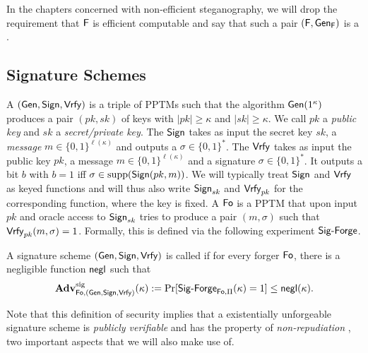 In the chapters concerned with
non-efficient steganography, we will drop the requirement that $\operatorname{\mathsf{F}}$ is
efficient computable and say that such a pair $(\operatorname{\mathsf{F}},\operatorname{\mathsf{Gen}}_{\operatorname{\mathsf{F}}})$ is a
. 


\subsection*{Signature Schemes}
A  $(\operatorname{\mathsf{Gen}},\operatorname{\mathsf{Sign}},\operatorname{\mathsf{Vrfy}})$ is a triple of
\acp{PPTM} such that the algorithm $\operatorname{\mathsf{Gen}}(1^{\kappa})$ produces a pair $(pk,sk)$ of
keys with $|pk|\geq \kappa$ and $|sk|\geq \kappa$. We call $pk$ a
\emph{public key} and $sk$ a \emph{secret/private key}. The  $\operatorname{\mathsf{Sign}}$ takes as input the secret key $sk$, a \emph{message}
$m\in \{0,1\}^{\ell(\kappa)}$ and outputs a  $\sigma\in
\{0,1\}^{*}$. The  $\operatorname{\mathsf{Vrfy}}$ takes as input the
public key $pk$, a message $m\in \{0,1\}^{\ell(\kappa)}$ and a signature
$\sigma\in \{0,1\}^{*}$. It outputs a bit $b$ with $b=1$ iff $\sigma \in
\operatorname{supp}(\operatorname{\mathsf{Sign}}(pk,m))$. We will typically treat $\operatorname{\mathsf{Sign}}$ and $\operatorname{\mathsf{Vrfy}}$ as
keyed functions and will thus also write $\operatorname{\mathsf{Sign}}_{sk}$ and $\operatorname{\mathsf{Vrfy}}_{pk}$
for the corresponding function, where the key is fixed. A 
$\operatorname{\mathsf{Fo}}$ is a \ac{PPTM} that upon input $pk$ and oracle access to
$\operatorname{\mathsf{Sign}}_{sk}$ tries to produce a pair $(m,\sigma)$ such that
$\operatorname{\mathsf{Vrfy}}_{pk}(m,\sigma)=1$. Formally, this is defined via the following
experiment $\Sig-Forge$.


A signature scheme $(\operatorname{\mathsf{Gen}},\operatorname{\mathsf{Sign}},\operatorname{\mathsf{Vrfy}})$ is called  if for every forger $\operatorname{\mathsf{Fo}}$, there is a negligible
function $\operatorname{\mathsf{negl}}$ such that
\begin{align*}
  \Adv^{\sig}_{\Forg,(\Gen,\Sign,\Vrfy)}(\kappa) :=
  \Pr[\Sig-Forge_{\Forg,\Pi}(\kappa)=1]\leq \negl(\kappa).
\end{align*}

Note that this definition of security implies that a existentially
unforgeable signature scheme is \emph{publicly verifiable} and has the
property of \emph{non-repudiation} \cite{lindell2007introduction}, two
important aspects that we will also make use of.

